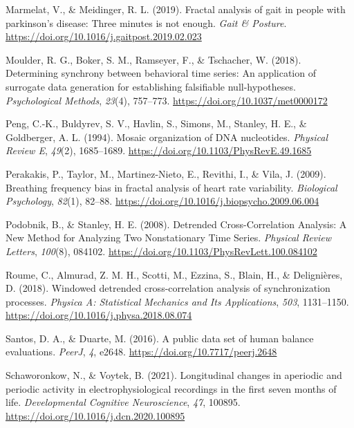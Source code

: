 \documentclass[
  man]{apa6}
\newlength{\cslhangindent}
\newlength{\cslentryspacingunit} %
\newenvironment{CSLReferences}[2] %
 {%
  \setlength{\parindent}{0pt}
  \ifodd #1
  \let\oldpar\par
  \def\par{\hangindent=\cslhangindent\oldpar}
  \fi
  \setlength{\parskip}{#2\cslentryspacingunit}
 }%
 {}
\begin{document}
\begin{CSLReferences}{1}{0}
\leavevmode{}%
Marmelat, V., \& Meidinger, R. L. (2019). Fractal analysis of gait in people with parkinson{'}s disease: Three minutes is not enough. \emph{Gait \& Posture}. \url{https://doi.org/10.1016/j.gaitpost.2019.02.023}

\leavevmode{}%
Moulder, R. G., Boker, S. M., Ramseyer, F., \& Tschacher, W. (2018). Determining synchrony between behavioral time series: An application of surrogate data generation for establishing falsifiable null-hypotheses. \emph{Psychological Methods}, \emph{23}(4), 757--773. \url{https://doi.org/10.1037/met0000172}

\leavevmode{}%
Peng, C.-K., Buldyrev, S. V., Havlin, S., Simons, M., Stanley, H. E., \& Goldberger, A. L. (1994). Mosaic organization of {DNA} nucleotides. \emph{Physical Review E}, \emph{49}(2), 1685--1689. \url{https://doi.org/10.1103/PhysRevE.49.1685}

\leavevmode{}%
Perakakis, P., Taylor, M., Martinez-Nieto, E., Revithi, I., \& Vila, J. (2009). Breathing frequency bias in fractal analysis of heart rate variability. \emph{Biological Psychology}, \emph{82}(1), 82--88. \url{https://doi.org/10.1016/j.biopsycho.2009.06.004}

\leavevmode{}%
Podobnik, B., \& Stanley, H. E. (2008). Detrended {Cross}-{Correlation} {Analysis}: {A} {New} {Method} for {Analyzing} {Two} {Nonstationary} {Time} {Series}. \emph{Physical Review Letters}, \emph{100}(8), 084102. \url{https://doi.org/10.1103/PhysRevLett.100.084102}

\leavevmode{}%
Roume, C., Almurad, Z. M. H., Scotti, M., Ezzina, S., Blain, H., \& Delignières, D. (2018). Windowed detrended cross-correlation analysis of synchronization processes. \emph{Physica A: Statistical Mechanics and Its Applications}, \emph{503}, 1131--1150. \url{https://doi.org/10.1016/j.physa.2018.08.074}

\leavevmode{}%
Santos, D. A., \& Duarte, M. (2016). A public data set of human balance evaluations. \emph{PeerJ}, \emph{4}, e2648. \url{https://doi.org/10.7717/peerj.2648}

\leavevmode{}%
Schaworonkow, N., \& Voytek, B. (2021). Longitudinal changes in aperiodic and periodic activity in electrophysiological recordings in the first seven months of life. \emph{Developmental Cognitive Neuroscience}, \emph{47}, 100895. \url{https://doi.org/10.1016/j.dcn.2020.100895}


\end{CSLReferences}
\end{document}

